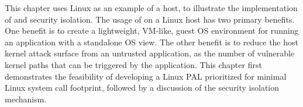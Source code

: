 This chapter uses Linux as an example
of a \graphene{} host, to illustrate the implementation of \thehostabi{}
and security isolation.
The usage of \graphene{} on a Linux host
has two primary benefits.
One benefit is to create a lightweight, VM-like, guest OS environment for running an application
with a standalone OS view.
The other benefit is
to reduce the host kernel attack surface from an untrusted application,
as the number of vulnerable kernel paths that can be triggered by the application.
This chapter first demonstrates the feasibility of developing a Linux PAL prioritized for minimal Linux system call footprint,
followed by a discussion of the security isolation mechanism.


